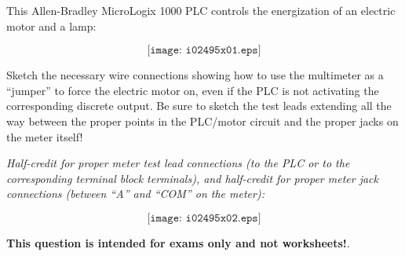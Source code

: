 

This Allen-Bradley MicroLogix 1000 PLC controls the energization of an electric motor and a lamp:

$$\texttt{[image: i02495x01.eps]}$$

Sketch the necessary wire connections showing how to use the multimeter as a ``jumper'' to force the electric motor on, even if the PLC is not activating the corresponding discrete output.  Be sure to sketch the test leads extending all the way between the proper points in the PLC/motor circuit and the proper jacks on the meter itself!







{\it Half-credit for proper meter test lead connections (to the PLC or to the corresponding terminal block terminals), and half-credit for proper meter jack connections (between ``A'' and ``COM'' on the meter):}

$$\texttt{[image: i02495x02.eps]}$$







{\bf This question is intended for exams only and not worksheets!}.


